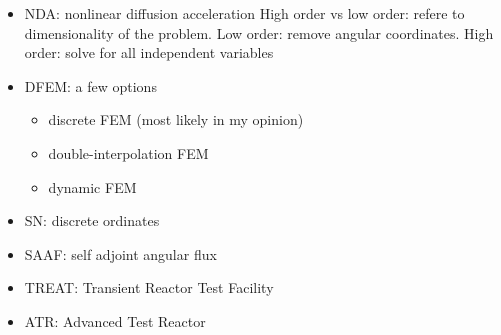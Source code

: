 \documentclass[12pt]{article}
\begin{document}
\begin{itemize}
  \item NDA: nonlinear diffusion acceleration
    High order vs low order: refere to dimensionality of the problem. Low order: remove angular coordinates. High order: solve for all independent variables
  \item DFEM: a few options
    \begin{itemize}
      \item discrete FEM (most likely in my opinion)
      \item double-interpolation FEM
      \item dynamic FEM
    \end{itemize}
  \item SN: discrete ordinates
  \item SAAF: self adjoint angular flux
  \item TREAT: Transient Reactor Test Facility
  \item ATR: Advanced Test Reactor
\end{itemize}
\end{document}
